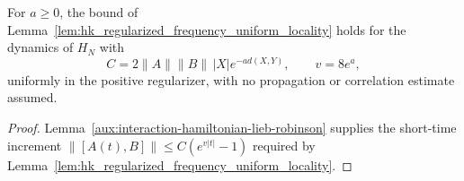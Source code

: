 \begin{lemma}
    \label{cor:spt_finite_ring_regularized_frequency_locality}
    \leanok
    For $a\ge0$, the bound of Lemma~\ref{lem:hk_regularized_frequency_uniform_locality}
    holds for the dynamics of $H_N$ with
    \[
        C=2\|A\|\|B\|\,|X|e^{-a d(X,Y)},
        \qquad v=8e^a,
    \]
    uniformly in the positive regularizer, with no propagation or correlation estimate
    assumed.
\end{lemma}
\begin{proof}\leanok
    Lemma~\ref{aux:interaction-hamiltonian-lieb-robinson} supplies the short-time increment
    $\|[A(t),B]\|\le C(e^{v|t|}-1)$ required by
    Lemma~\ref{lem:hk_regularized_frequency_uniform_locality}.
\end{proof}
